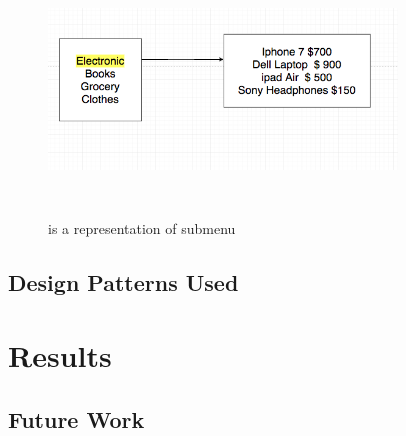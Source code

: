\documentclass[10pt,conference,onecolumn,compsoc]{IEEEtran}
\begin{document}
\begin{figure}[H]
\includegraphics[height=250px, width=350px]{electronics}
\caption{is a representation of submenu}
\label{submenu}
\end{figure}



\subsection{Design Patterns Used}


\section{Results}

\subsection{Future Work}
\end{document}
